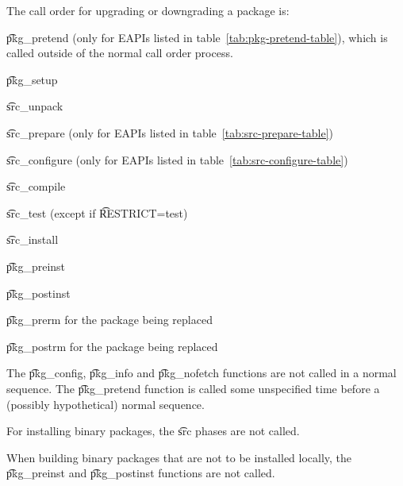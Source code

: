 The call order for upgrading or downgrading a package is:

\begin{compactitem}
\item \t{pkg\_pretend} (only for EAPIs listed in table~\ref{tab:pkg-pretend-table}), which is called
    outside of the normal call order process.
\item \t{pkg\_setup}
\item \t{src\_unpack}
\item \t{src\_prepare} (only for EAPIs listed in table~\ref{tab:src-prepare-table})
\item \t{src\_configure} (only for EAPIs listed in table~\ref{tab:src-configure-table})
\item \t{src\_compile}
\item \t{src\_test} (except if \t{RESTRICT=test})
\item \t{src\_install}
\item \t{pkg\_preinst}
\item \t{pkg\_postinst}
\item \t{pkg\_prerm} for the package being replaced
\item \t{pkg\_postrm} for the package being replaced
\end{compactitem}

The \t{pkg\_config}, \t{pkg\_info} and \t{pkg\_nofetch} functions are not called in a normal
sequence. The \t{pkg\_pretend} function is called some unspecified time before a (possibly
hypothetical) normal sequence.

For installing binary packages, the \t{src} phases are not called.

When building binary packages that are not to be installed locally, the \t{pkg\_preinst}
and \t{pkg\_postinst} functions are not called.


